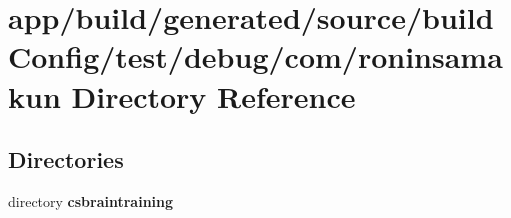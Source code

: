 \section{app/build/generated/source/build\+Config/test/debug/com/roninsamakun Directory Reference}
\label{dir_25bc85eae3850e6cd346c1b27432ef86}
\subsection*{Directories}
\begin{DoxyCompactItemize}
\item 
directory {\bf csbraintraining}
\end{DoxyCompactItemize}
